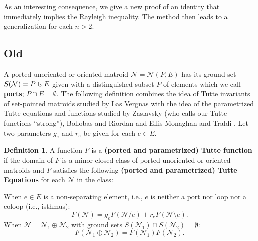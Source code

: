 \documentclass[12pt]{article}
\theoremstyle{definition}
\newtheorem{definition}[theorem]{Definition}
\newcommand{\dunion}
{\mbox{\hbox{\hskip6pt$\cdot$\hskip-5.50pt$\cup$\hskip2pt}}}
\begin{document}
As an interesting consequence, we give a new proof of an identity
that immediately implies the Rayleigh inequality.  The method then
leads to a generalization for each $n > 2$.

\newpage

\subsection{Old}


A ported unoriented or oriented matroid 
$\mathcal{N}=\mathcal{N}(P,E)$ 
has its ground set 
$S(\mathcal{N})=P\dunion E$ given with a distinguished
subset $P$ of elements which we call \textbf{ports}; $P\cap E=\emptyset$.
The following definition 
combines the idea of Tutte invariants of set-pointed matroids
studied by Las Vergnas
\cite{MR0419272,TPMorphMat80,SetPointedLV}
with the idea of the parametrized Tutte equations and functions 
studied by 
Zaslavsky\cite{MR93a:05047} (who calls our Tutte functions ``strong''), 
Bollobas and 
Riordan\cite{BollobasRiordanTuttePolyColored} and
Ellis-Monaghan and Traldi \cite{Ellis-Monaghan-Traldi}.
Let two parameters $g_e$ and $r_e$ be given for each $e\in E$.

\begin{definition}
\label{firstTutteFunction}
A function $F$ is a 
\textbf{(ported and parametrized) Tutte function}
if the domain of  $F$ is 
a minor closed class
of ported unoriented or oriented matroids and
$F$ satisfies the following
\textbf{(ported and parametrized) Tutte Equations}
for each $\mathcal{N}$ in the class:


When $e\in E$ is a non-separating element, i.e.,
$e$ is neither a port nor loop nor a coloop (i.e., isthmus):
\begin{equation}\label{TGplus}
	F(\mathcal{N}) = g_eF(\mathcal{N}/ e) + r_eF(\mathcal{N}\setminus e).
\end{equation}
When $\mathcal{N}=\mathcal{N}_1\oplus\mathcal{N}_2$
with ground sets $S(\mathcal{N}_1)\cap S(\mathcal{N}_2)=\emptyset$:
\begin{equation}\label{TGtimes}
	F(\mathcal{N}_1\oplus\mathcal{N}_2) = F(\mathcal{N}_1)F(\mathcal{N}_2).
\end{equation}


\end{definition}
\end{document}
